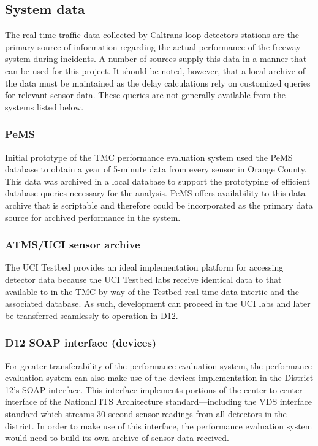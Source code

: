 \documentclass[12pt]{report}
\begin{document}
\subsection{System data}
\label{sec:system-data}

The real-time traffic data collected by Caltrans loop detectors stations are the
primary source of information regarding the actual performance of the freeway
system during incidents. A number of sources supply this data in a manner that
can be used for this project.  It should be noted, however, that a local archive
of the data must be maintained as the delay calculations rely on customized
queries for relevant sensor data.  These queries are not generally available
from the systems listed below.

\subsubsection{PeMS}
\label{sec:pems}

Initial prototype of the TMC performance evaluation system used the PeMS
database to obtain a year of 5-minute data from every sensor in Orange County.
This data was archived in a local database to support the prototyping of
efficient database queries necessary for the analysis.  PeMS offers availability
to this data archive that is scriptable and therefore could be incorporated as
the primary data source for archived performance in the system.

\subsubsection{ATMS/UCI sensor archive}
\label{sec:uci-data}


The UCI Testbed provides an ideal implementation platform for accessing detector
data because the UCI Testbed labs receive identical data to that available to in
the TMC by way of the Testbed real-time data intertie and the associated
database.  As such, development can proceed in the UCI labs and later be
transferred seamlessly to operation in D12.

\subsubsection{D12 SOAP interface (devices)}
\label{sec:d12-soap}

For greater transferability of the performance evaluation system, the
performance evaluation system can also make use of the devices implementation in
the District 12's SOAP interface.  This interface implements portions of the
center-to-center interface of the National ITS Architecture standard---including
the VDS interface standard which streams 30-second sensor readings from all
detectors in the district.  In order to make use of this interface, the
performance evaluation system would need to build its own archive of sensor data
received.
\end{document}
